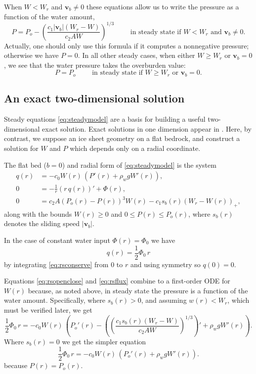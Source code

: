 \documentclass[11pt,final]{amsart}%
\newcommand\bv{\mathbf{v}}
\begin{document}
When $W<W_r$ and $\bv_b \ne 0$ these equations allow us to write the pressure as a function of the water amount,
	$$P = P_o - \left(\frac{c_1 |\bv_b| (W_r - W)}{c_2 A W}\right)^{1/3} \qquad \text{ in steady state if $W<W_r$ and $\bv_b \ne 0$}.$$
Actually, one should only use this formula if it computes a nonnegative pressure; otherwise we have $P=0$.  In all other steady cases, when either $W\ge W_r$ or $\bv_b=0$, we see that the water pressure takes the overburden value:
	$$P = P_o \qquad \text{ in steady state if $W\ge W_r$ or $\bv_b=0$}.$$

\subsection*{An exact two-dimensional solution}  Steady equations \eqref{eq:steadymodel} are a basis for building a useful two-dimensional exact solution.  Exact solutions in one dimension appear in \cite{Schoofetal2012}.  Here, by contrast, we suppose an ice sheet geometry on a flat bedrock, and construct a solution for $W$ and $P$ which depends only on a radial coordinate.

The flat bed ($b=0$) and radial form of \eqref{eq:steadymodel} is the system
\begin{align}
q(r) &= - c_0 W(r)\, \left(P'(r) + \rho_w g W'(r)\right), \label{eq:rsflux} \\
0 &= - \frac{1}{r}\left(r\,q(r)\right)' + \Phi(r), \label{eq:rsconserve} \\
0 &= c_2 A (P_o(r) - P(r))^3 W(r) - c_1 s_b(r) (W_r - W(r))_+, \label{eq:rsopenclose}
\end{align}
along with the bounds $W(r)\ge 0$ and $0 \le P(r) \le P_o(r)$, where $s_b(r)$ denotes the sliding speed $|\bv_b|$.

In the case of constant water input $\Phi(r)=\Phi_0$ we have
	$$q(r) = \frac{1}{2} \Phi_0\, r$$
by integrating \eqref{eq:rsconserve} from $0$ to $r$ and using symmetry so $q(0)=0$.  

Equations \eqref{eq:rsopenclose} and \eqref{eq:rsflux} combine to a first-order ODE for $W(r)$ because, as noted above, in steady state the pressure is a function of the water amount.  Specifically, where $s_b(r)>0$, and assuming $w(r) < W_r$, which must be verified later, we get
	$$\frac{1}{2} \Phi_0\, r = - c_0 W(r)\, \left(P_o'(r) - \left(\left(\frac{c_1 s_b(r) (W_r - W)}{c_2 A W}\right)^{1/3}\right)' + \rho_w g W'(r)\right).$$
Where $s_b(r)=0$ we get the simpler equation
	$$\frac{1}{2} \Phi_0\, r = - c_0 W(r)\, \left(P_o'(r) + \rho_w g W'(r)\right).$$
because $P(r)=P_o(r)$.
\end{document}
